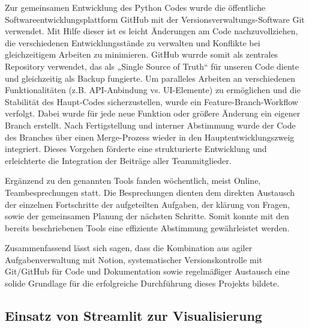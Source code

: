Zur gemeinsamen Entwicklung des Python Codes wurde die öffentliche Softwareentwicklungsplattform GitHub mit der Versionsverwaltungs-Software Git verwendet. Mit Hilfe dieser ist es leicht Änderungen am Code nachzuvollziehen, die verschiedenen Entwicklungsstände zu verwalten und Konflikte bei gleichzeitigem Arbeiten zu minimieren. GitHub wurrde somit als zentrales Repository verwendet, das als „Single Source of Truth“ für unseren Code diente und gleichzeitig als Backup fungierte. Um paralleles Arbeiten an verschiedenen Funktionalitäten (z.B. API-Anbindung vs. UI-Elemente) zu ermöglichen und die Stabilität des Haupt-Codes sicherzustellen, wurde ein Feature-Branch-Workflow verfolgt. Dabei wurde für jede neue Funktion oder größere Änderung ein eigener Branch erstellt. Nach Fertigstellung und interner Abstimmung wurde der Code des Branches über einen Merge-Prozess wieder in den Hauptentwicklungszweig integriert. Dieses Vorgehen förderte eine strukturierte Entwicklung und erleichterte die Integration der Beiträge aller Teammitglieder.

Ergänzend zu den genannten Tools fanden wöchentlich, meist Online, Teambesprechungen statt. Die Besprechungen dienten dem direkten Austausch der einzelnen Fortschritte der aufgeteilten Aufgaben, der klärung von Fragen, sowie der gemeinsamen Planung der nächsten Schritte. Somit konnte mit den bereits beschriebenen Tools eine effiziente Abstimmung gewährleistet werden. 

Zusammenfassend lässt sich sagen, dass die Kombination aus agiler Aufgabenverwaltung mit Notion, systematischer Versionskontrolle mit Git/GitHub für Code und Dokumentation sowie regelmäßiger Austausch eine solide Grundlage für die erfolgreiche Durchführung dieses Projekts bildete.

\subsection{Einsatz von Streamlit zur Visualisierung}

